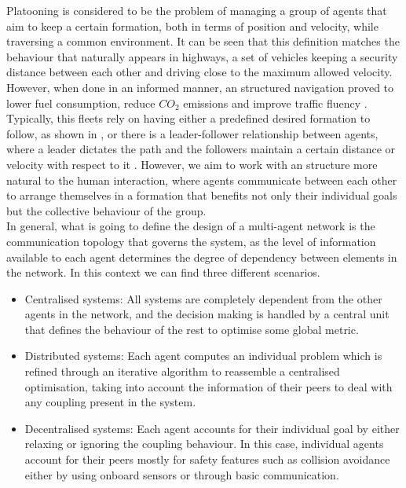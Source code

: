 \documentclass[a4paper,fleqn]{cas-sc}
\begin{document}
Platooning is considered to be the problem of managing a group of agents that aim to keep a certain formation, both in terms of position and velocity, while traversing a common environment. It can be seen that this definition matches the behaviour that naturally appears in highways, a set of vehicles keeping a security distance between each other and driving close to the maximum allowed velocity. However, when done in an informed manner, an structured navigation proved to lower fuel
consumption, reduce $CO_2$ emissions and improve traffic fluency \cite{FuelMinimisation}. Typically, this fleets rely on having either a predefined desired formation to follow, as shown in \cite{FormationControlDistri}, or there is a leader-follower relationship between agents, where a leader dictates the path and the followers maintain a certain distance or velocity with respect to it \cite{Liu2017}.  However, we aim to work with an structure more natural to the human interaction, where agents communicate between each other to arrange themselves in a formation that benefits not only their individual goals but the collective behaviour of the group. \\ 

In general, what is going to define the design of a multi-agent network is the communication topology that governs the system, as the level of information available to each agent determines the degree of dependency between elements in the network. In this context we can find three different scenarios.
\begin{itemize}
    \item Centralised systems: All systems are completely dependent from the other agents in the network, and the decision making is handled by a central unit that defines the behaviour of the rest to optimise some global metric. 
    \item Distributed systems: Each agent computes an individual problem which is refined through an iterative algorithm to reassemble a centralised optimisation, taking into account the information of their peers to deal with any coupling present in the system. 
    \item Decentralised systems: Each agent accounts for their individual goal by either relaxing or ignoring the coupling behaviour. In this case, individual agents account for their peers mostly for safety features such as collision avoidance either by using onboard sensors or through basic communication.  
\end{itemize}
\end{document}
